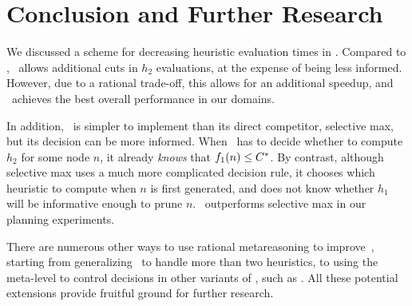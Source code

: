 \section{Conclusion and Further Research}

We discussed a scheme for decreasing heuristic evaluation
times in \lazyastar. Compared to \lazyastar, \rationallazyastar~allows
additional cuts in $h_2$ evaluations, at the expense of being less
informed. However, due to a rational trade-off, this
allows for an additional speedup, and \rationallazyastar~achieves the
best overall performance in our domains.

In addition, \rationallazyastar~is simpler to implement than its direct
competitor, selective max, but its decision can be more informed.  When
\rationallazyastar~has to decide whether to compute $h_2$ for some node
$n$, it already {\em knows} that $f_1(n) \leq C^\ast$.  By contrast,
although selective max uses a much more complicated decision rule, it
chooses which heuristic to compute when $n$ is first generated, and does
not know whether $h_1$ will be informative enough to prune $n$.
\rationallazyastar~outperforms selective max in our planning experiments.

There are numerous other ways to use rational metareasoning to
improve~\astar, starting from generalizing \rationallazyastar~to
handle more than two heuristics, to using the meta-level to control
decisions in other variants of \astar, such as \idastar. All these potential extensions
provide fruitful ground for further research.
